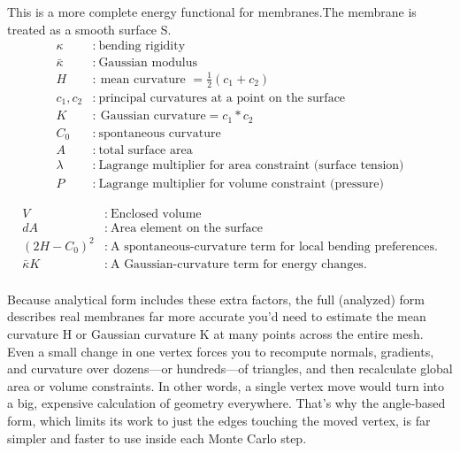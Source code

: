 \documentclass[12pt]{article}
\begin{document}
\begin{flushleft}
\noindent This is a more complete energy functional for membranes.The membrane is treated as a smooth surface S.
\vspace{-2em} 
\begin{align*}
\kappa &:\ \text{bending rigidity} \\
\bar{\kappa} &:\ \text{Gaussian modulus} \\
H &:\ \text{mean curvature $= \frac{1}{2} (c_1 + c_2)$} \\
c_1,c_2 &:\ \text{principal curvatures at a point on the surface}\\
K &:\ \text{Gaussian curvature}=c_1*c_2 \\
C_0 &:\ \text{spontaneous curvature} \\
A &:\ \text{total surface area} \\
\lambda &:\ \text{Lagrange multiplier for area constraint (surface tension)} \\
P &:\ \text{Lagrange multiplier for volume constraint (pressure)}
\end{align*}


\vspace{-3em} 
\begin{align*}
V &:\ \text{Enclosed volume}\\
dA &:\ \text{Area element on the surface}\\
(2H - C_0)^2 &:\ \text{A spontaneous-curvature term for local bending preferences.}\\
\bar{\kappa} K &:\ \text{A Gaussian-curvature term for energy changes.}\\
\end{align*}

\vspace{-3em}

Because analytical form includes these extra factors, the full (analyzed) form describes real membranes far more accurate you’d need to estimate the mean curvature H or Gaussian curvature K at many points across the entire mesh. Even a small change in one vertex forces you to recompute normals, gradients, and curvature over dozens—or hundreds—of triangles, and then recalculate global area or volume constraints. In other words, a single vertex move would turn into a big, expensive calculation of geometry everywhere. That’s why the angle‐based form, which limits its work to just the edges touching the moved vertex, is far simpler and faster to use inside each Monte Carlo step.













\end{flushleft}
\end{document}
